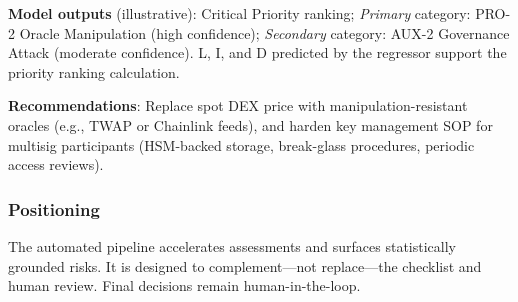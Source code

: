 \textbf{Model outputs} (illustrative): Critical Priority ranking; \textit{Primary} category: PRO-2 Oracle Manipulation (high confidence); \textit{Secondary} category: AUX-2 Governance Attack (moderate confidence). L, I, and D predicted by the regressor support the priority ranking calculation.

\textbf{Recommendations}: Replace spot DEX price with manipulation-resistant oracles (e.g., TWAP or Chainlink feeds), and harden key management SOP for multisig participants (HSM-backed storage, break-glass procedures, periodic access reviews).

\subsubsection{Positioning}
The automated pipeline accelerates assessments and surfaces statistically grounded risks. It is designed to complement---not replace---the checklist and human review. Final decisions remain human-in-the-loop.


